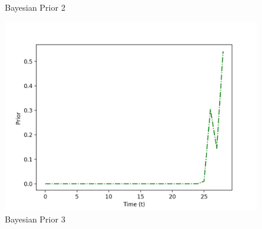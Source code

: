 \begin{figure}[H]
  \caption{Bayesian Prior 2}\label{fig:awesome_image2}
\endminipage\hfill
{}%
  \includegraphics[width=\linewidth]{Images/Figure_prior3.png}
  \caption{Bayesian Prior 3}\label{fig:awesome_image3}
\endminipage
\end{figure}

